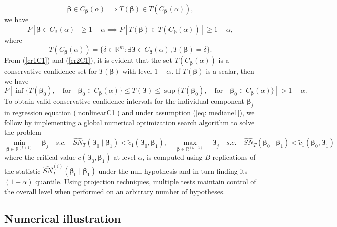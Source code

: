 \documentclass[harvard,11pt]{article}
\begin{document}
\begin{equation}
\bm{\beta} \in C_{\bm{\beta} }(\alpha )\implies T(\bm{\beta} )\in T(C_{\bm{\beta} }(\alpha )),
\label{cr1C1}
\end{equation}%
we have
\begin{equation}
P[\bm{\beta} \in C_{\bm{\beta} }(\alpha )]\geq 1-\alpha \implies P%
[T(\bm{\beta} )\in T(C_{\bm{\beta} }(\alpha ))]\geq 1-\alpha,   \label{cr2C1}
\end{equation}%
where
\begin{equation*}
T(C_{\bm{\beta} }(\alpha ))=\{\delta \in \mathbb{R}^{m}:\exists \bm{\beta} \in
C_{\bm{\beta} }(\alpha ),T(\bm{\beta} )=\delta \}.
\end{equation*}%
From (\ref{cr1C1}) and (\ref{cr2C1}), it is evident that the set $T(C_{\bm{\beta} }(\alpha ))$ is a
conservative confidence set for $T(\bm{\beta} )$ with level $1-\alpha $. If $T(\bm{\beta} )$ is a scalar, then we have
\begin{equation*}
P\left[\inf \{T(\bm{\beta} _{0}),\quad\text{for}\quad\bm{\beta}_{0}\in C_{\bm{\beta}
}(\alpha )\}\leq T(\bm{\beta} )\leq \sup \{T(\bm{\beta}_{0}),\quad\text{for}\quad\bm{\beta}
_{0}\in C_{\bm{\beta} }(\alpha )\}\right]>1-\alpha .
\end{equation*}
To obtain valid conservative confidence intervals for the individual component $\bm{\beta}_j$ in regression equation (\ref{nonlinearC1}) and under assumption (\ref{eq: mediane1}), we follow \citet{coudin2009finite} by implementing a global numerical optimization search algorithm to solve the problem
\begin{equation}\label{eq: SA} 
\min\limits_{\bm{\beta}\in\mathbb{R}^{(k+1)}}\quad\bm{\beta}_j\quad s.c.\quad\widehat{SN}_{T}(\bm{\beta}_0\mid\bm{\beta}_1)<\tilde{c}_1(\bm{\beta} _{0},\bm{\beta}_{1}),\quad\max\limits_{\bm{\beta}\in\mathbb{R}^{(k+1)}}\quad\bm{\beta}_j\quad s.c.\quad\widehat{SN}_{T}(\bm{\beta}_0\mid\bm{\beta}_1)<\tilde{c}_1(\bm{\beta}_{0},\bm{\beta}_{1}) 
\end{equation}
where the critical value $c(\bm{\beta}_0,\bm{\beta}_1)$ at level $\alpha$, is computed using $B$ replications of the statistic $\widehat{SN}_{T}^{(i)}(\bm{\beta}_0\mid\bm{\beta}_1)$ under the null hypothesis and in turn finding its $(1-\alpha)$ quantile. Using projection techniques, multiple tests maintain control of the overall level when performed on an arbitrary number of hypotheses. 

\subsection{Numerical illustration}\label{Numerical illustration}
\end{document}
